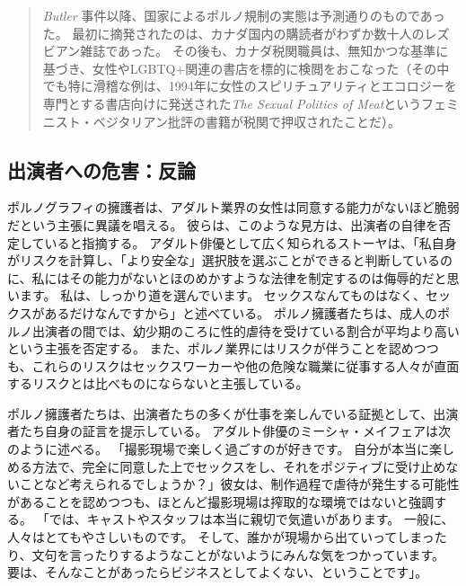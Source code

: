 \documentclass[paper=a4,book,openany]{jlreq}
\begin{document}
\begin{quote}
\emph{Butler} 事件以降、国家によるポルノ規制の実態は予測通りのものであった。
最初に摘発されたのは、カナダ国内の購読者がわずか数十人のレズビアン雑誌であった。
その後も、カナダ税関職員は、無知かつな基準に基づき、女性やLGBTQ+関連の書店を標的に検閲をおこなった（その中でも特に滑稽な例は、1994年に女性のスピリチュアリティとエコロジーを専門とする書店向けに発送された\emph{The Sexual Politics of Meat}というフェミニスト・ベジタリアン批評の書籍が税関で押収されたことだ）。
\citep{green00:pornographies}
\end{quote}

\subsection{出演者への危害：反論}

ポルノグラフィの擁護者は、アダルト業界の女性は同意する能力がないほど脆弱だという主張に異議を唱える。
彼らは、このような見方は、出演者の自律を否定していると指摘する。
アダルト俳優として広く知られるストーヤは、「私自身がリスクを計算し、「より安全な」選択肢を選ぶことができると判断しているのに、私にはその能力がないとほのめかすような法律を制定するのは侮辱的だと思います。
私は、しっかり道を選んでいます。
セックスなんてものはなく、セックスがあるだけなんですから」と述べている\citep{kernes12:_no_gover_waste_commit_holds_press_confer}。
ポルノ擁護者たちは、成人のポルノ出演者の間では、幼少期のころに性的虐待を受けている割合が平均より高いという主張を否定する\citep[p.621]{griffith13:_pornog_actres}。
また、ポルノ業界にはリスクが伴うことを認めつつも、これらのリスクはセックスワーカーや他の危険な職業に従事する人々が直面するリスクとは比べものにならないと主張している。

ポルノ擁護者たちは、出演者たちの多くが仕事を楽しんでいる証拠として、出演者たち自身の証言を提示している。
アダルト俳優のミーシャ・メイフェアは次のように述べる。
「撮影現場で楽しく過ごすのが好きです。
自分が本当に楽しめる方法で、完全に同意した上でセックスをし、それをポジティブに受け止めないことなど考えられるでしょうか？」彼女は、制作過程で虐待が発生する可能性があることを認めつつも、ほとんど撮影現場は搾取的な環境ではないと強調する。
「では、キャストやスタッフは本当に親切で気遣いがあります。
一般に、人々はとてもやさしいものです。
そして、誰かが現場から出ていってしまったり、文句を言ったりするようなことがないようにみんな気をつかっています。
要は、そんなことがあったらビジネスとしてよくない、ということです」\citep{sisley19:_common_myths_porn_debun_porn_perfor}。
\end{document}
